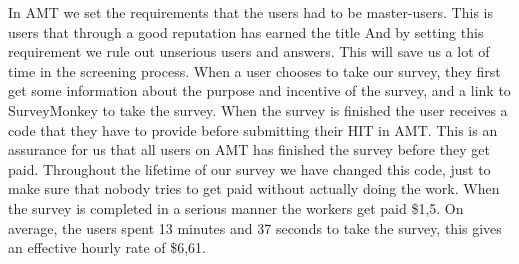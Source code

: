 In AMT we set the requirements that the users had to be master-users. This is users that through a good reputation has earned the title And by setting this requirement we rule out unserious users and answers. This will save us a lot of time in the screening process. When a user chooses to take our survey, they first get some information about the purpose and incentive of the survey, and a link to SurveyMonkey to take the survey. When the survey is finished the user receives a code that they have to provide before submitting their HIT in AMT. This is an assurance for us that all users on AMT has finished the survey before they get paid. Throughout the lifetime of our survey we have changed this code, just to make sure that nobody tries to get paid without actually doing the work. When the survey is completed in a serious manner the workers get paid \$1,5. On average, the users spent 13 minutes and 37 seconds to take the survey, this gives an effective hourly rate of \$6,61.     


 


